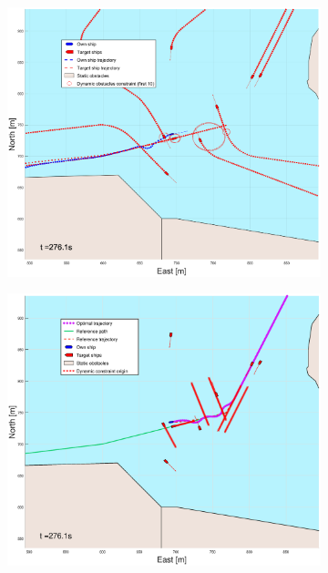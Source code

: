 \begin{figure}[ht!]
\begin{subfigure}[b]{0.499\textwidth}
    \end{subfigure}
    \hfill
    \\ 
    \begin{subfigure}[b]{0.49\textwidth}
        \centering
        \includegraphics[width=\textwidth]{Images/Figures/Trheimfjord/_Simple_1fig1_time=276}
    \end{subfigure}
    \hfill
    \begin{subfigure}[b]{0.499\textwidth}
        \centering
        \includegraphics[width=\textwidth]{Images/Figures/Trheimfjord/_Simple_1fig999_time=276}
    \end{subfigure}
    \hfill
\end{figure}
